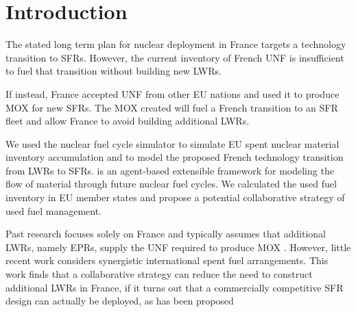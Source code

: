 
\section{Introduction}
The stated long term plan for nuclear deployment in France targets a technology 
transition to \glspl{SFR}\cite{cne2_reports_2015}. However, the current inventory of French \gls{UNF} 
is insufficient to fuel that transition without building new \glspl{LWR}.

If instead, France accepted 
\gls{UNF} from other \gls{EU} nations and used it to produce \gls{MOX} for new \glspl{SFR}.
The \gls{MOX} created will fuel a French transition to an \gls{SFR} fleet
and allow France to avoid building additional \glspl{LWR}.


We used the \Cyclus nuclear fuel cycle simulator \cite{huff_fundamental_2016} to simulate
 \gls{EU} spent nuclear material inventory accumulation and to model the 
 proposed French 
 technology transition from \glspl{LWR} to
 \glspl{SFR}. \Cyclus is an agent-based extensible
framework for modeling the flow of material through future nuclear fuel cycles.
We calculated the used fuel
inventory in \gls{EU} member states and propose a potential collaborative
strategy of used fuel management.


Past research focuses solely on France and typically assumes that additional \glspl{LWR},
namely \glspl{EPR}, supply the \gls{UNF} required to produce \gls{MOX} \cite{carre_overview_2009, martin_symbiotic_2017, freynet_multiobjective_2016}.
However, little recent work considers synergistic international spent fuel arrangements.
This work finds that a collaborative strategy can reduce the
need to construct additional \glspl{LWR} in France, if it turns
out that a commercially competitive \gls{SFR} design can actually be
deployed, as has been proposed \cite{zhao_improving_2009}
